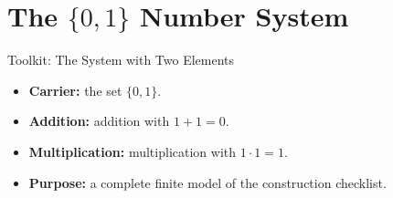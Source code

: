 \section{\texorpdfstring{The \(\{0,1\}\) Number System}{The 0,1 Number System}}
\begin{toolkitbox}{Toolkit: The System with Two Elements}
\begin{itemize}
  \item \textbf{Carrier:} the set \(\{0,1\}\).
  \item \textbf{Addition:} addition with \(1+1=0\).
  \item \textbf{Multiplication:} multiplication with \(1\cdot 1=1\).
  \item \textbf{Purpose:} a complete finite model of the construction checklist.
\end{itemize}
\end{toolkitbox}


